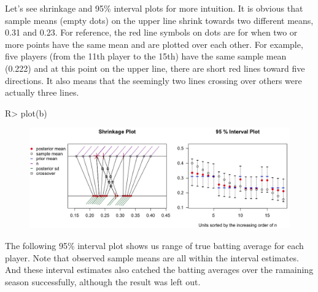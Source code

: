 \documentclass[article]{jss}
\begin{document}
Let's see shrinkage and 95\% interval plots for more intuition. It is obvious that sample means (empty dots) on the upper line shrink towards two different means, 0.31 and 0.23. For reference, the red line symbols on dots are for when two or more points have the same mean and are plotted over each other. For example, five players (from the 11th player to the 15th) have the same sample mean (0.222) and at this point on the upper line, there are short red lines toward five directions. It also means that the seemingly two lines crossing over others were actually three lines. 
\begin{CodeChunk}
\begin{CodeInput}
R> plot(b)
\end{CodeInput}
\end{CodeChunk}
\begin{figure}[h]
\begin{center}
\includegraphics[scale=0.3]{baseball1.png}
\end{center}
\end{figure}

The following 95\% interval plot shows us range of true batting average for each player. Note that observed sample means are all within the interval estimates. And these interval estimates also catched the batting averages over the ramaining season successfully, although the result was left out.
\\
\end{document}
